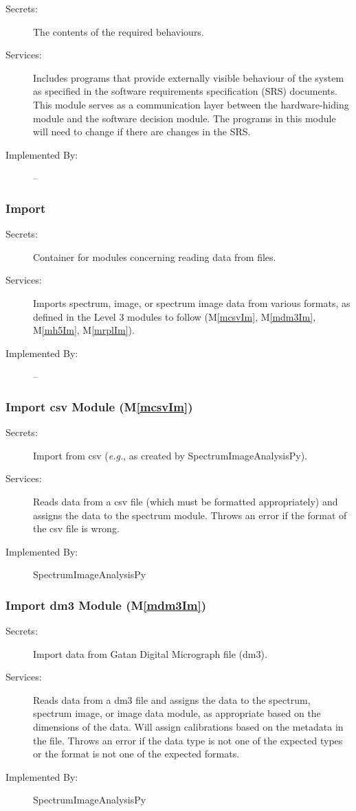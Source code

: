 \documentclass[12pt, titlepage]{article}
\newcommand{\mref}[1]{M\ref{#1}}
\newcommand{\progname}{SpectrumImageAnalysisPy}
\begin{document}
\begin{description}
\item[Secrets:]The contents of the required behaviours.
\item[Services:]Includes programs that provide externally visible behaviour of
  the system as specified in the software requirements specification (SRS)
  documents. This module serves as a communication layer between the
  hardware-hiding module and the software decision module. The programs in this
  module will need to change if there are changes in the SRS.
\item[Implemented By:] --
\end{description}

\subsubsection{Import}
\begin{description}
	\item[Secrets:]Container for modules concerning reading data from files.
	\item[Services:]Imports spectrum, image, or spectrum image data from various
formats, as defined in the Level 3 modules to follow (\mref{mcsvIm},
\mref{mdm3Im}, \mref{mh5Im}, \mref{mrplIm}). 
	\item[Implemented By:] --
\end{description}

\subsubsection{Import csv Module (\mref{mcsvIm})}
\begin{description}
	\item[Secrets:]Import from csv (\textit{e.g.}, as created by \progname).
	\item[Services:]Reads data from a csv file (which must be formatted
appropriately) and assigns the data to the spectrum module. Throws an error if
the format of the csv file is wrong.
	\item[Implemented By:] \progname
\end{description}

\subsubsection{Import dm3 Module (\mref{mdm3Im})}
\begin{description}
	\item[Secrets:]Import data from Gatan Digital Micrograph file (dm3).
	\item[Services:]Reads data from a dm3 file and assigns the data to the
spectrum, spectrum image, or image data module, as appropriate based on the
dimensions of the data. Will assign calibrations based on the metadata in the
file. Throws an error if the data type is not one of the expected types or the
format is not one of the expected formats.
	\item[Implemented By:] \progname
\end{description}
\end{document}
